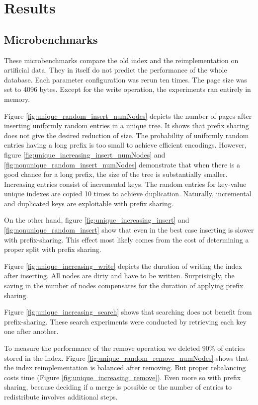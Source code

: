 \documentclass[11pt,a4paper,oneside]{article}
\begin{document}

\section{Results}
\subsection{Microbenchmarks} %
\label{sub:microbenchmarks}
These microbenchmarks compare the old index and the reimplementation on artificial data. 
They in itself do not predict the performance of the whole database.
Each parameter configuration was rerun ten times. 
The page size was set to 4096 bytes.
Except for the write operation, the experiments ran entirely in memory.

Figure \ref{fig:unique_random_insert_numNodes} depicts the number of pages after inserting uniformly random entries in a unique tree.
It shows that prefix sharing does not give the desired reduction of size.
The probability of uniformly random entries having a long prefix is too small to achieve efficient encodings.
However, figure \ref{fig:unique_increasing_insert_numNodes} and \ref{fig:nonunique_random_insert_numNodes} demonstrate 
that when there is a good chance for a long prefix, the size of the tree is substantially smaller.
Increasing entries consist of incremental keys. The random entries for key-value unique indexes are copied 10 times to achieve duplication.
Naturally, incremental and duplicated keys are exploitable with prefix sharing.

On the other hand, figure \ref{fig:unique_increasing_insert} and \ref{fig:nonunique_random_insert} show that even in the best case inserting is slower with prefix-sharing. 
This effect most likely comes from the cost of determining a proper split with prefix sharing.

Figure \ref{fig:unique_increasing_write} depicts the duration of writing the index after inserting. 
All nodes are dirty and have to be written.
Surprisingly, the saving in the number of nodes compensates for the duration of applying prefix sharing.

Figure \ref{fig:unique_increasing_search} shows that searching does not benefit from prefix-sharing. These search experiments were conducted by retrieving each key one after another.

To measure the performance of the remove operation we deleted $90\%$ of entries stored in the index.
Figure \ref{fig:unique_random_remove_numNodes} shows that the index reimplementation is balanced after removing. 
But proper rebalancing costs time (Figure \ref{fig:unique_increasing_remove}). 
Even more so with prefix sharing, because deciding if a merge is possible or the number of entries to redistribute involves additional steps.
\end{document}
